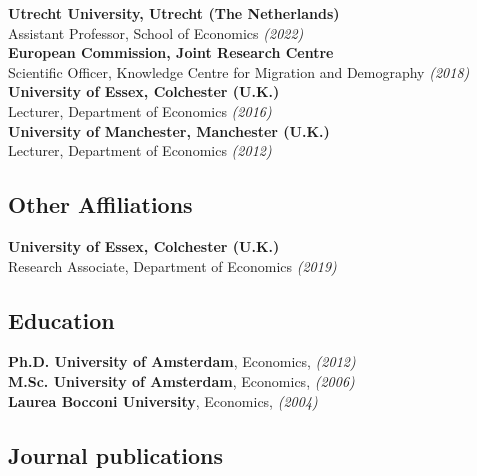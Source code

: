 \documentclass[11pt]{article}
\begin{document}
\hspace{20pt}\textbf{Utrecht University, Utrecht (The Netherlands)}\\
\hspace*{27pt}Assistant Professor, School of Economics \emph{(2022\textendash)}\\
\hspace*{20pt}\textbf{European Commission, Joint Research Centre}\\
\hspace*{27pt}Scientific Officer, Knowledge Centre for Migration and Demography \emph{(2018)}\\
\hspace*{20pt}\textbf{University of Essex, Colchester (U.K.)}\\
\hspace*{27pt}Lecturer, Department of Economics \emph{(2016)}\\
\hspace*{20pt}\textbf{University of Manchester, Manchester (U.K.)}\\
\hspace*{27pt}Lecturer, Department of Economics \emph{(2012)}

\subsection*{\sc Other Affiliations}
\hspace{20pt}\textbf{University of Essex, Colchester (U.K.)}\\
\hspace*{27pt}Research Associate, Department of Economics \emph{(2019)}

\subsection*{\sc Education}

\hspace*{20pt}\textbf{Ph.D. University of Amsterdam}, Economics, \emph{(2012)} \\
\hspace*{20pt}\textbf{M.Sc. University of Amsterdam}, Economics,  \emph{(2006)} \\
\hspace*{20pt}\textbf{Laurea Bocconi University}, Economics, \emph{ (2004)}

\subsection*{\sc Journal publications}
\end{document}
